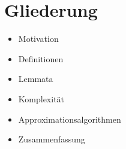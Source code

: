 \section{Gliederung}

\begin{frame}{\FrameName}
	\begin{itemize}
		\item Motivation
		\item Definitionen
		\item Lemmata
		\item Komplexität
		\item Approximationsalgorithmen
		\item Zusammenfassung
	\end{itemize}
\end{frame}